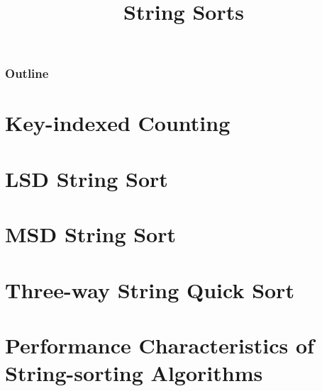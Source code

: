 \documentclass[8pt,a4paper,compress]{beamer}
\title{String Sorts}
\date{}
\begin{document}
\begin{frame}
\vfill
\titlepage
\end{frame}

\begin{frame}
\frametitle{Outline}
\tableofcontents
\end{frame}

\section{Key-indexed Counting}
\begin{frame}[fragile]
\pause

\end{frame}

\section{LSD String Sort}
\begin{frame}[fragile]
\pause

\end{frame}

\section{MSD String Sort}
\begin{frame}[fragile]
\pause

\end{frame}

\section{Three-way String Quick Sort}
\begin{frame}[fragile]
\pause

\end{frame}

\section{Performance Characteristics of String-sorting Algorithms}
\begin{frame}[fragile]
\pause

\end{frame}
\end{document}
